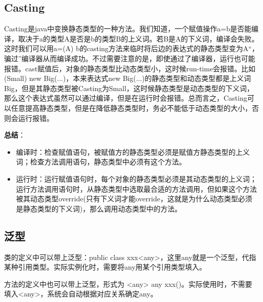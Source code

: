 \documentclass{article}
\begin{document}
	\subsection{Casting}
	Casting是java中变换静态类型的一种方法。我们知道，一个赋值操作a=b是否能编译，取决于a的类型A是否是b的类型B的上义词。若B是A的下义词，编译会失败。这时我们可以用a=(A) b的casting方法来临时将后边的表达式的静态类型变为A“，骗过”编译器从而编译成功。不过需要注意的是，即使通过了编译器，运行也可能报错。cast赋值后，对象的静态类型比动态类型小，这时候run-time会报错。比如(Small) new Big(...)，本来表达式new Big(...)的静态类型和动态类型都是上义词Big，但是其静态类型被Casting为Small，这时候静态类型是动态类型的下义词，那么这个表达式虽然可以通过编译，但是在运行时会报错。总而言之，Casting可以任意提高静态类型，但是在降低静态类型时，务必不能低于动态类型的大小，否则会运行报错。
	
	{\bfseries 总结}：
	\begin{itemize}
		\item 编译时：检查赋值语句，被赋值方的静态类型必须是赋值方静态类型的上义词；检查方法调用语句，静态类型中必须有这个方法。
		\item 运行时：运行赋值语句时，每个对象的静态类型必须是其动态类型的上义词；运行方法调用语句时，从静态类型中选取最合适的方法调用，但如果这个方法被其动态类型override(只有下义词才能override，这就是为什么动态类型必须是静态类型的下义词)，那么调用动态类型中的方法。
	\end{itemize}
	\subsection{泛型}
	类的定义中可以带上泛型：public class xxx<any>，这里any就是一个泛型，代指某种引用类型。实际实例化时，需要将any用某个引用类型填入。
	
	方法的定义中也可以带上泛型，形式为 <any> any xxx()。实际使用时，不需要填入<any>，系统会自动根据对应关系确定any。
\end{document}
